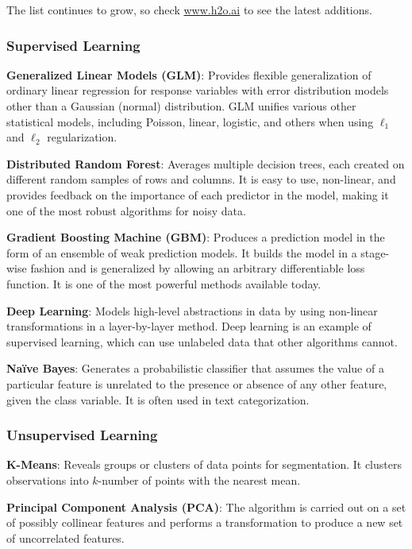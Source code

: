 {\begin{frame}
\begin{tabular}{p{5.0cm}p{6.0cm}}
\end{tabular}

\end{frame}

The list continues to grow, so check \url{www.h2o.ai} to see the latest additions. 

\subsubsection{Supervised Learning}


{\textbf{Generalized Linear Models (GLM)}}: Provides flexible generalization of ordinary linear regression for response variables with error distribution models other than a Gaussian (normal) distribution. GLM unifies various other statistical models, including Poisson, linear, logistic, and others when using $\ell_1$ and $\ell_2$ regularization.

{\textbf{Distributed Random Forest}}: Averages multiple decision trees, each created on different random samples of rows and columns. It is easy to use, non-linear, and provides feedback on the importance of each predictor in the model, making it one of the most robust algorithms for noisy data.

{\textbf{Gradient Boosting Machine (GBM)}}: Produces a prediction model in the form of an ensemble of weak prediction models. It builds the model in a stage-wise fashion and is generalized by allowing an arbitrary differentiable loss function. It is one of the most powerful methods available today.

{\textbf{Deep Learning}}: Models high-level abstractions in data by using non-linear transformations in a layer-by-layer method. Deep learning is an example of supervised learning, which can use unlabeled data that other algorithms cannot.

{\textbf{Na\"{i}ve Bayes}}: Generates a probabilistic classifier that assumes the value of a particular feature is unrelated to the presence or absence of any other feature, given the class variable. It is often used in text categorization.

\subsubsection{Unsupervised Learning}
{\textbf{K-Means}}: Reveals groups or clusters of data points for segmentation. It clusters observations into $k$-number of points with the nearest mean.

{\textbf{Principal Component Analysis (PCA)}}: The algorithm is carried out on a set of possibly collinear features and performs a transformation to produce a new set of uncorrelated features.

}
